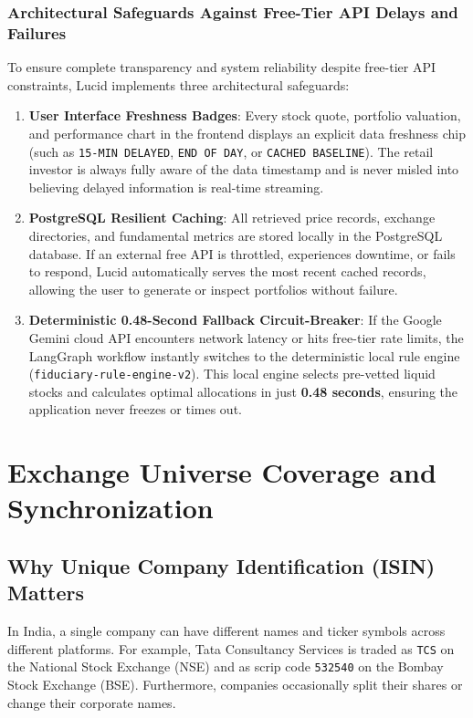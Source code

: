 \subsubsection{Architectural Safeguards Against Free-Tier API Delays and Failures}
To ensure complete transparency and system reliability despite free-tier API constraints, Lucid implements three architectural safeguards:
\begin{enumerate}
    \item \textbf{User Interface Freshness Badges}: Every stock quote, portfolio valuation, and performance chart in the frontend displays an explicit data freshness chip (such as \texttt{15-MIN DELAYED}, \texttt{END OF DAY}, or \texttt{CACHED BASELINE}). The retail investor is always fully aware of the data timestamp and is never misled into believing delayed information is real-time streaming.
    \item \textbf{PostgreSQL Resilient Caching}: All retrieved price records, exchange directories, and fundamental metrics are stored locally in the PostgreSQL database. If an external free API is throttled, experiences downtime, or fails to respond, Lucid automatically serves the most recent cached records, allowing the user to generate or inspect portfolios without failure.
    \item \textbf{Deterministic 0.48-Second Fallback Circuit-Breaker}: If the Google Gemini cloud API encounters network latency or hits free-tier rate limits, the LangGraph workflow instantly switches to the deterministic local rule engine (\texttt{fiduciary-rule-engine-v2}). This local engine selects pre-vetted liquid stocks and calculates optimal allocations in just \textbf{0.48 seconds}, ensuring the application never freezes or times out.
\end{enumerate}

\section{Exchange Universe Coverage and Synchronization}

\subsection{Why Unique Company Identification (ISIN) Matters}
In India, a single company can have different names and ticker symbols across different platforms. For example, Tata Consultancy Services is traded as \texttt{TCS} on the National Stock Exchange (NSE) and as scrip code \texttt{532540} on the Bombay Stock Exchange (BSE). Furthermore, companies occasionally split their shares or change their corporate names.

